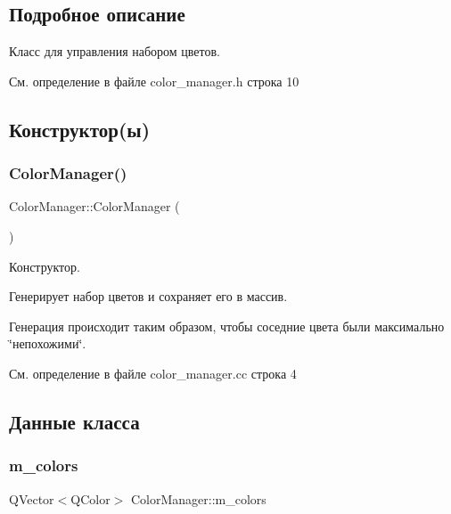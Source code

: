 \subsection{Подробное описание}
Класс для управления набором цветов. 

См. определение в файле color\+\_\+manager.\+h строка 10



\subsection{Конструктор(ы)}
\hypertarget{class_color_manager_a430efaaefd3650e29bcf4802394c29e9}{}\label{class_color_manager_a430efaaefd3650e29bcf4802394c29e9} 
\subsubsection{\texorpdfstring{Color\+Manager()}{ColorManager()}}
{\footnotesize\ttfamily Color\+Manager\+::\+Color\+Manager (\begin{DoxyParamCaption}{ }\end{DoxyParamCaption})}



Конструктор. 

Генерирует набор цветов и сохраняет его в массив.

Генерация происходит таким образом, чтобы соседние цвета были максимально \char`\"{}непохожими\char`\"{}. 

См. определение в файле color\+\_\+manager.\+cc строка 4



\subsection{Данные класса}
\hypertarget{class_color_manager_ac91ea962bfa95bc3ed7da0bfd44615f4}{}\label{class_color_manager_ac91ea962bfa95bc3ed7da0bfd44615f4} 
\subsubsection{\texorpdfstring{m\+\_\+colors}{m\_colors}}
{\footnotesize\ttfamily Q\+Vector$<$Q\+Color$>$ Color\+Manager\+::m\+\_\+colors\hspace{0.3cm}{\ttfamily [private]}}

